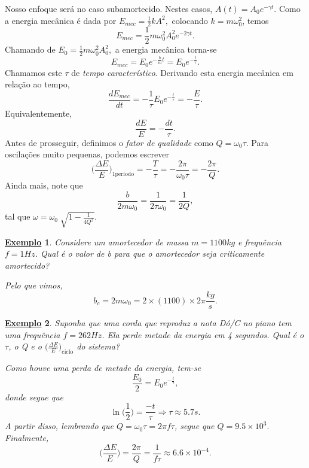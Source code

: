 \documentclass{article}
\newtheorem{example}{\underline{Exemplo}}
\begin{document}
Nosso enfoque será no caso subamortecido. Nestes casos, \(A(t) = A_{0}e^{-\gamma t}.\) Como 
a energia mecânica é dada por \(E_{mec} = \frac{1}{2}kA^{2},\) colocando \(k=m\omega_{0}^{2}\), temos 
\[
  E_{mec} = \frac{1}{2}m\omega_{0}^{2}A_{0}^{2}e^{-2\gamma t}.
\]
Chamando de \(E_{0} = \frac{1}{2}m\omega_{0}^{2}A_{0}^{2},\) a energia mecânica torna-se 
\[
  E_{mec} = E_{0}e^{-\frac{b}{m}t} = E_{0}e^{-\frac{t}{\tau }}.
\]
Chamamos este \(\tau \) de \textit{tempo característico}. Derivando esta energia mecânica em relação ao tempo, 
\[
  \frac{dE_{mec}}{dt} = -\frac{1}{\tau }E_{0} e^{-\frac{t}{\tau }} = -\frac{E}{\tau }.
\]
Equivalentemente, 
\[
  \frac{dE}{E} = -\frac{dt}{\tau }.
\]
Antes de prosseguir, definimos o \textit{fator de qualidade} como \(Q = \omega_{0}\tau \). Para
oscilações muito pequenas, podemos escrever 
\[
  \biggl(\frac{\Delta E}{E}\biggr)_{1\text{período}} = -\frac{T}{\tau } = -\frac{2\pi }{\omega_{0}\tau } = -\frac{2\pi }{Q}.
\]
Ainda mais, note que 
\[
  \frac{b}{2m\omega_{0}} = \frac{1}{2\tau \omega_{0}} = \frac{1}{2Q}, 
\]
tal que \(\omega = \omega_{0}\sqrt[]{1 - \frac{1}{4Q^{2}}}\).
\begin{example}
  Considere um amortecedor de massa \(m=1100kg\) e frequência \(f = 1Hz\). Qual é o valor de b para que o amortecedor
  seja criticamente amortecido?

  Pelo que vimos, 
  \[
    b_{c} = 2m\omega_{0} = 2\times(1100)\times 2\pi \frac{kg}{s}.
  \]
\end{example}
\begin{example}
  Suponha que uma corda que reproduz a nota Dó/C no piano tem uma frequência \(f = 262Hz\). Ela perde metade
  da energia em 4 segundos. Qual é o \(\tau \), o Q e o \(\biggl(\frac{\Delta E}{E}\biggr)_{\text{ciclo}}\) do sistema?

  Como houve uma perda de metade da energia, tem-se 
  \[
    \frac{E_{0}}{2} = E_{0}e^{-\frac{t}{\tau }},
  \]
  donde segue que 
  \[
    \ln \biggl(\frac{1}{2}\biggr) = \frac{-t}{\tau } \Rightarrow \tau \approx 5.7s.
  \]
  A partir disso, lembrando que \(Q = \omega_{0}\tau  = 2\pi f \tau \), segue que \(Q = 9.5\times 10^{3}.\) Finalmente, 
  \[
    \biggl(\frac{\Delta E}{E}\biggr) = \frac{2\pi }{Q} = \frac{1}{f\tau }\approx 6.6\times 10^{-4}.
  \]
\end{example}
\end{document}
